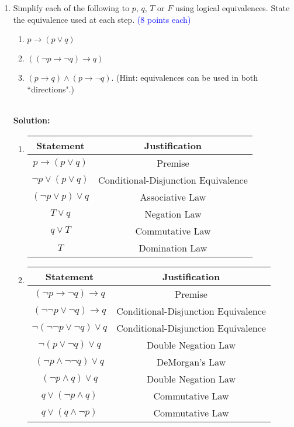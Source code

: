 \documentclass{article}
\newcommand{\pte}[1]{\textcolor{blue}{(#1 points each)}}
\newenvironment{solution} {
    \par
    \color{blue}
    \vspace{2mm}
    \hline \\
    \textbf{Solution:}
} {
    \vspace{2mm}
    \newpage
}
\begin{document}
\begin{enumerate}
    \item Simplify each of the following to $p$, $q$, $T$ or $F$ using logical equivalences. State the equivalence used at each step. \pte 8
    \begin{enumerate}
        \item $p \rightarrow (p \lor q)$
        \item $((\lnot p \rightarrow \lnot q) \rightarrow q)$
        \item $(p \rightarrow q) \wedge (p \rightarrow \lnot q)$. (Hint: equivalences can be used in both ``directions".)
    \end{enumerate}
    
    \begin{solution}
    \begin{enumerate}
        \item
        \begin{tabular}{c|c}
        Statement & Justification\\
        \hline
        $p \rightarrow (p \lor q)$ & Premise\\
        $\neg p \lor (p \lor q)$ & Conditional-Disjunction Equivalence \\
        $(\neg p \lor p) \lor q$ & Associative Law \\
        $T \lor q$ & Negation Law \\
        $q \lor T$ & Commutative Law \\
        $T$ & Domination Law \\
        \end{tabular}
        \item
        \begin{tabular}{c|c}
        Statement & Justification\\
        \hline
        $(\lnot p \rightarrow \lnot q) \rightarrow q$ & Premise\\
        $(\neg \neg p \lor \neg q) \rightarrow q$ & Conditional-Disjunction Equivalence \\
        $\neg(\neg \neg p \lor \neg q) \lor q$ & Conditional-Disjunction Equivalence \\
        $\neg (p \lor \neg q) \lor q$ & Double Negation Law \\
        $(\neg p \land \neg \neg q) \lor q$ & DeMorgan's Law \\
        $(\neg p \land  q) \lor q$ & Double Negation Law \\
        $q \lor (\neg p \land  q)$ & Commutative Law \\
        $q \lor (q \land \neg p)$ & Commutative Law \\

\end{tabular}
\end{enumerate}
\end{solution}
\end{enumerate}
\end{document}

